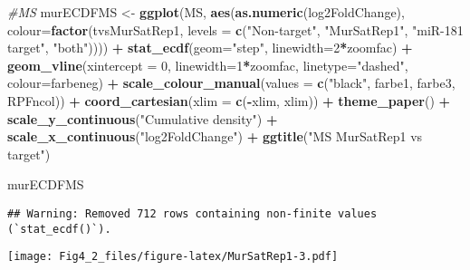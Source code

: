 \documentclass[
]{article}
\newenvironment{Shaded}{\begin{snugshade}}{\end{snugshade}}
\newcommand{\AttributeTok}[1]{\textcolor[rgb]{0.13,0.29,0.53}{#1}}
\newcommand{\CommentTok}[1]{\textcolor[rgb]{0.56,0.35,0.01}{\textit{#1}}}
\newcommand{\DecValTok}[1]{\textcolor[rgb]{0.00,0.00,0.81}{#1}}
\newcommand{\FunctionTok}[1]{\textcolor[rgb]{0.13,0.29,0.53}{\textbf{#1}}}
\newcommand{\NormalTok}[1]{#1}
\newcommand{\OtherTok}[1]{\textcolor[rgb]{0.56,0.35,0.01}{#1}}
\newcommand{\SpecialCharTok}[1]{\textcolor[rgb]{0.81,0.36,0.00}{\textbf{#1}}}
\newcommand{\StringTok}[1]{\textcolor[rgb]{0.31,0.60,0.02}{#1}}
\begin{document}
\begin{Shaded}
\begin{Highlighting}[]
\CommentTok{\#MS}
\NormalTok{murECDFMS }\OtherTok{\textless{}{-}} \FunctionTok{ggplot}\NormalTok{(MS, }\FunctionTok{aes}\NormalTok{(}\FunctionTok{as.numeric}\NormalTok{(log2FoldChange), }\AttributeTok{colour=}\FunctionTok{factor}\NormalTok{(tvsMurSatRep1, }\AttributeTok{levels =} \FunctionTok{c}\NormalTok{(}\StringTok{"Non{-}target"}\NormalTok{, }\StringTok{"MurSatRep1"}\NormalTok{, }\StringTok{"miR{-}181 target"}\NormalTok{, }\StringTok{"both"}\NormalTok{)))) }\SpecialCharTok{+} 
  \FunctionTok{stat\_ecdf}\NormalTok{(}\AttributeTok{geom=}\StringTok{"step"}\NormalTok{, }\AttributeTok{linewidth=}\DecValTok{2}\SpecialCharTok{*}\NormalTok{zoomfac) }\SpecialCharTok{+}
  \FunctionTok{geom\_vline}\NormalTok{(}\AttributeTok{xintercept =} \DecValTok{0}\NormalTok{, }\AttributeTok{linewidth=}\DecValTok{1}\SpecialCharTok{*}\NormalTok{zoomfac, }\AttributeTok{linetype=}\StringTok{"dashed"}\NormalTok{, }\AttributeTok{colour=}\NormalTok{farbeneg) }\SpecialCharTok{+}
  \FunctionTok{scale\_colour\_manual}\NormalTok{(}\AttributeTok{values =} \FunctionTok{c}\NormalTok{(}\StringTok{"black"}\NormalTok{, farbe1, farbe3, RPFncol)) }\SpecialCharTok{+}
  \FunctionTok{coord\_cartesian}\NormalTok{(}\AttributeTok{xlim =} \FunctionTok{c}\NormalTok{(}\SpecialCharTok{{-}}\NormalTok{xlim, xlim)) }\SpecialCharTok{+} 
  \FunctionTok{theme\_paper}\NormalTok{() }\SpecialCharTok{+}
  \FunctionTok{scale\_y\_continuous}\NormalTok{(}\StringTok{"Cumulative density"}\NormalTok{) }\SpecialCharTok{+} \FunctionTok{scale\_x\_continuous}\NormalTok{(}\StringTok{"log2FoldChange"}\NormalTok{) }\SpecialCharTok{+}
  \FunctionTok{ggtitle}\NormalTok{(}\StringTok{"MS MurSatRep1 vs target"}\NormalTok{)}

\NormalTok{murECDFMS}
\end{Highlighting}
\end{Shaded}

\begin{verbatim}
## Warning: Removed 712 rows containing non-finite values (`stat_ecdf()`).
\end{verbatim}

\texttt{[image: Fig4\_2\_files/figure-latex/MurSatRep1-3.pdf]}
\end{document}
